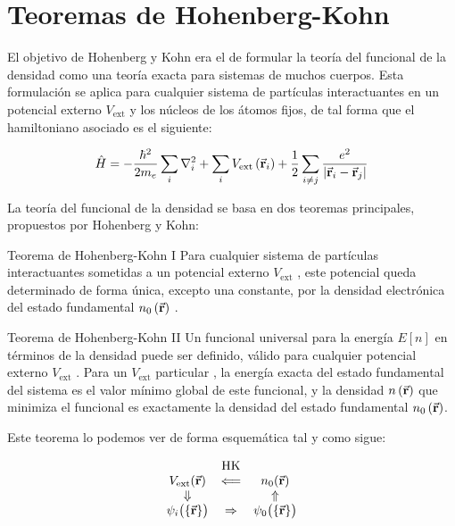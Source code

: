 \section{Teoremas de Hohenberg-Kohn}

El objetivo de Hohenberg y Kohn era el de formular la teoría del funcional de la densidad como una teoría exacta para sistemas de muchos cuerpos. Esta formulación se aplica para cualquier sistema de partículas interactuantes en un potencial externo $V_{\text{ext}}$ y los núcleos de los átomos fijos, de tal forma que el hamiltoniano asociado es el siguiente:

\begin{equation}
    \hat{H} = - \frac{\hbar^2}{2 m_{e}} \sum_i \nabla_{i}^2 + \sum_i V_{\text{ext}}  \left( \va{r}_i  \right)  + \frac{1}{2} \sum_{i \neq j} \frac{e^2}{\abs{ \va{r}_i - \va{r}_j} }
\end{equation}

La teoría del funcional de la densidad se basa en dos teoremas principales, propuestos por Hohenberg y Kohn:

\begin{mytheo}{Teorema de Hohenberg-Kohn I}{}
    Para cualquier sistema de partículas interactuantes sometidas a un potencial externo $V_{\text{ext}}$ , este potencial queda determinado de forma única, excepto una constante, por la densidad electrónica del estado fundamental $n_0 \left( \va{r} \right)$ .
\end{mytheo}

\begin{mytheo}{Teorema de Hohenberg-Kohn II}{}
    Un funcional universal para la energía $E \left[ n \right]$ en términos de la densidad puede ser definido, válido para cualquier potencial externo $V_{\text{ext}}$ . Para un  $V_{\text{ext}}$ particular , la energía exacta del estado fundamental del sistema es el valor mínimo global de este funcional, y la densidad $n \left( \va{r} \right)$ que minimiza el funcional es exactamente la densidad del estado fundamental $n_0 \left( \va{r} \right)$.
\end{mytheo}


Este teorema lo podemos ver de forma esquemática tal y como sigue:

$$
\begin{array}{ccc}
   & \text{HK} & \\
   V_{\text{ext}}(\va{r}) 
     & \Longleftarrow 
     & n_0(\va{r}) \\
   \Downarrow 
     & 
     & \Uparrow \\
   \psi_i\bigl(\{\va{r}\}\bigr) 
     & \Rightarrow 
     & \psi_0\bigl(\{\va{r}\}\bigr)
\end{array}
$$

